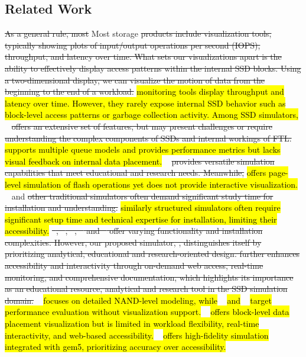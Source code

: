 \documentclass{ieeeaccess}
\begin{document}
\subsection{Related Work}
\sout{As a general rule, most} Most storage \sout{products include visualization tools, typically showing plots of input/output operations per second (IOPS), throughput, and latency over time. What sets our visualizations apart is the ability to effectively display access patterns within the internal SSD blocks. Using a two-dimensional display, we can visualize the motion of data from the beginning to the end of a workload.} \hl{monitoring tools display throughput and latency over time. However, they rarely expose internal SSD behavior such as block-level access patterns or garbage collection activity. Among SSD simulators,} \mqsim~\cite{MQSim-USENIX18} \sout{offers an extensive set of features, but may present challenges or require understanding the complex components of SSDs and internal workings of FTL.} \hl{supports multiple queue models and provides performance metrics but lacks visual feedback on internal data placement.}
\flashsim~\cite{FlashSim-FICASS-09} \sout{provides versatile simulation capabilities that meet educational and research needs. Meanwhile,} \hl{offers page-level simulation of flash operations yet does not provide interactive visualization.} \ssdmodel~\cite{SSDModel-USENIX-TC-08} and \sout{other traditional simulators often demand significant study time for installation and understanding.} \hl{similarly structured simulators often require significant setup time and technical expertise for installation, limiting their accessibility.} \sout{\nandflashsim~\mbox{\cite{NANDFlashSim-TOS-16}}, \vssim~\mbox{\cite{VSSIM-MSST-13}}, \wiscsim~\mbox{\cite{WiscSim-EuroSys-17}}, \ssdplayer~\mbox{\cite{visualizationSSDPlayer}} and \simplessd~\mbox{\cite{FTLSim-ACM-2017}} offer varying functionality and installation complexities. However, our proposed simulator, \eyanassdsim, distinguishes itself by prioritizing analytical, educational and research-oriented design. \eyanassdsim further enhances accessibility and interactivity through on-demand web access, real-time monitoring, and comprehensive documentation, which highlights its importance as an educational resource, analytical and research tool in the SSD simulation domain.} \nandflashsim~\cite{NANDFlashSim-TOS-16} \hl{focuses on detailed NAND-level modeling, while} \vssim~\cite{VSSIM-MSST-13} \hl{and} \wiscsim~\cite{WiscSim-EuroSys-17} \hl{target performance evaluation without visualization support.} \ssdplayer~\cite{visualizationSSDPlayer} \hl{offers block-level data placement visualization but is limited in workload flexibility, real-time interactivity, and web-based accessibility.} \simplessd~\cite{SimpleSSD-IEEE18} \hl{offers high-fidelity simulation integrated with gem5, prioritizing accuracy over accessibility.}
\end{document}
